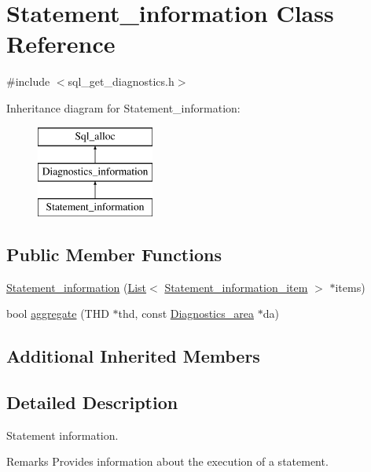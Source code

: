 \hypertarget{classStatement__information}{}\section{Statement\+\_\+information Class Reference}
\label{classStatement__information}


{\ttfamily \#include $<$sql\+\_\+get\+\_\+diagnostics.\+h$>$}

Inheritance diagram for Statement\+\_\+information\+:\begin{figure}[H]
\begin{center}
\leavevmode
\includegraphics[height=3.000000cm]{classStatement__information}
\end{center}
\end{figure}
\subsection*{Public Member Functions}
\begin{DoxyCompactItemize}
\item 
\mbox{\hyperlink{classStatement__information_a1bc5bf81891a58793dcdbe084dd2ea7c}{Statement\+\_\+information}} (\mbox{\hyperlink{classList}{List}}$<$ \mbox{\hyperlink{classStatement__information__item}{Statement\+\_\+information\+\_\+item}} $>$ $\ast$items)
\item 
bool \mbox{\hyperlink{classStatement__information_ab059a9e174ffce90b78d541ec4f93455}{aggregate}} (T\+HD $\ast$thd, const \mbox{\hyperlink{classDiagnostics__area}{Diagnostics\+\_\+area}} $\ast$da)
\end{DoxyCompactItemize}
\subsection*{Additional Inherited Members}


\subsection{Detailed Description}
Statement information.

\begin{DoxyRemark}{Remarks}
Provides information about the execution of a statement. 
\end{DoxyRemark}


